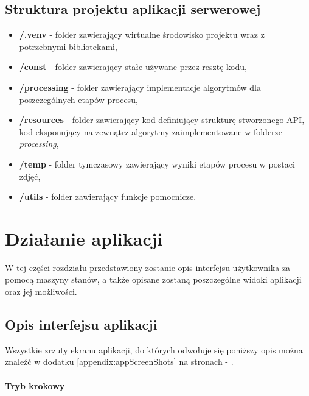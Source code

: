 \documentclass[10pt,polish,a4paper,oneside]{ppfcmthesis}
\begin{document}
\subsection{Struktura projektu aplikacji serwerowej}

\begin{itemize}
  \item \textbf{/.venv} - folder zawierający wirtualne środowisko projektu wraz z potrzebnymi
  bibliotekami,
  \item \textbf{/const} - folder zawierający stałe używane przez resztę kodu,
  \item \textbf{/processing} - folder zawierający implementacje algorytmów dla poszczególnych etapów
  procesu,
  \item \textbf{/resources} - folder zawierający kod definiujący strukturę stworzonego API,
  kod eksponujący na zewnątrz algorytmy zaimplementowane w folderze \textit{processing},
  \item \textbf{/temp} - folder tymczasowy zawierający wyniki etapów procesu w postaci zdję\'c,
  \item \textbf{/utils} - folder zawierający funkcje pomocnicze.
\end{itemize}

\section{Działanie aplikacji}

W tej części rozdziału przedstawiony zostanie opis interfejsu użytkownika za pomocą
maszyny stanów, a także opisane zostaną poszczególne widoki aplikacji oraz jej możliwości.

\subsection{Opis interfejsu aplikacji}

\noindent Wszystkie zrzuty ekranu aplikacji, do których odwołuje się poniższy opis można znale\'z\'c w dodatku
\ref{appendix:appScreenShots} na stronach \pageref{fig:homeScreen} - \pageref{fig:batchSingleEntryResult}. \newline

\vspace{-20pt}
\paragraph{Tryb krokowy\newline}
\end{document}
